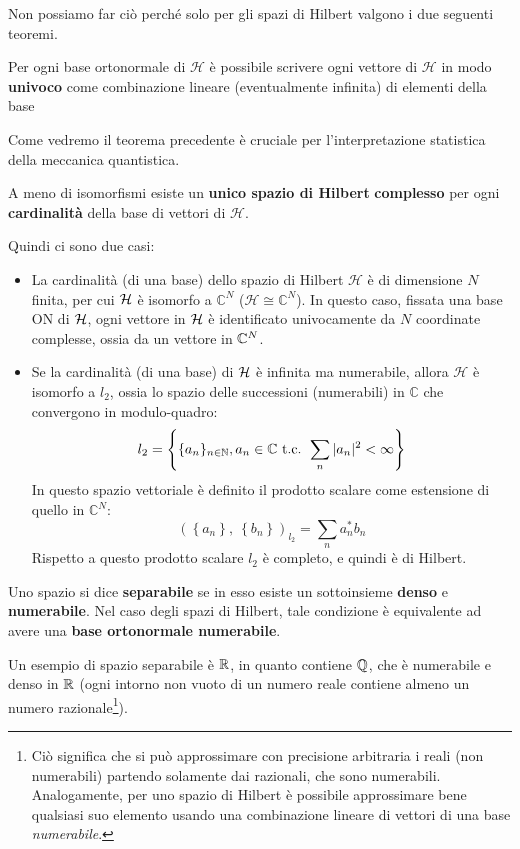 \documentclass[FisicaTeorica.tex]{subfiles}
\begin{document}
Non possiamo far ciò perché solo per gli spazi di Hilbert valgono i due seguenti teoremi.
\begin{thm}
Per ogni base ortonormale di $\mathcal{H}$ è possibile scrivere ogni vettore di $\mathcal{H}$ in modo \textbf{univoco} come combinazione lineare (eventualmente infinita) di elementi della base
\end{thm}
Come vedremo  il teorema precedente è cruciale per l'interpretazione statistica della meccanica quantistica.
\begin{thm}
A meno di isomorfismi esiste un \textbf{unico spazio di Hilbert} \textbf{complesso} per ogni \textbf{cardinalità} della base di vettori di $\mathcal{H}$.
\end{thm}
Quindi ci sono due casi:
\begin{itemize}
    \item La cardinalità (di una base) dello spazio di Hilbert $\mathcal{H}$ è di dimensione $N$ finita, per cui $\mathcal{H}$ è isomorfo a $\mathbb{C}^N$  ($\mathcal{H}\cong\mathbb{C}^N$). In questo caso, fissata una base ON di $\mathcal{H}$, ogni vettore in $\mathcal{H}$ è identificato univocamente da $N$ coordinate complesse, ossia da un vettore in $\mathbb{C}^N$.
    \item Se la cardinalità (di una base) di $\mathcal{H}$ è infinita ma numerabile, allora $\mathcal{H}$ è isomorfo a $l_2$, ossia lo spazio delle successioni (numerabili) in $\mathbb C$  che convergono in modulo-quadro:
    \[
	l_2 = \left \{ \{a_n\}_{n\in\mathbb{N}}, a_n \in \mathbb{C} \text{ t.c. } \sum_n |a_n|^2 < \infty \right \}
	\]
	In questo spazio vettoriale è definito il prodotto scalare come estensione di quello in $\mathbb{C}^N$:
	\[
	\left(\left\{a_n\right\},\ \left\{b_n\right\}\right)_{l_2}= \sum_{n}{a_n^* b_n}
	\]
    Rispetto a questo prodotto scalare $l_2$ è completo, e quindi è di Hilbert. 
    \end{itemize}
\begin{dfn}
Uno spazio si dice \textbf{separabile}  se in esso esiste un sottoinsieme \textbf{denso} e \textbf{numerabile}. Nel caso degli spazi di Hilbert, tale condizione è equivalente ad avere una \textbf{base ortonormale numerabile}.\\
\end{dfn}
\begin{expl}
Un esempio di spazio separabile è $\mathbb{R}$, in quanto contiene $\mathbb{Q}$, che è numerabile e denso in $\mathbb{R}$ (ogni intorno non vuoto di un numero reale contiene almeno un numero razionale\footnote{Ciò significa che si può approssimare con precisione arbitraria i reali (non numerabili) partendo solamente dai razionali, che sono numerabili. Analogamente, per uno spazio di Hilbert è possibile approssimare bene qualsiasi suo elemento usando una combinazione lineare di vettori di una base \textit{numerabile}.}).
\end{expl}
\end{document}
